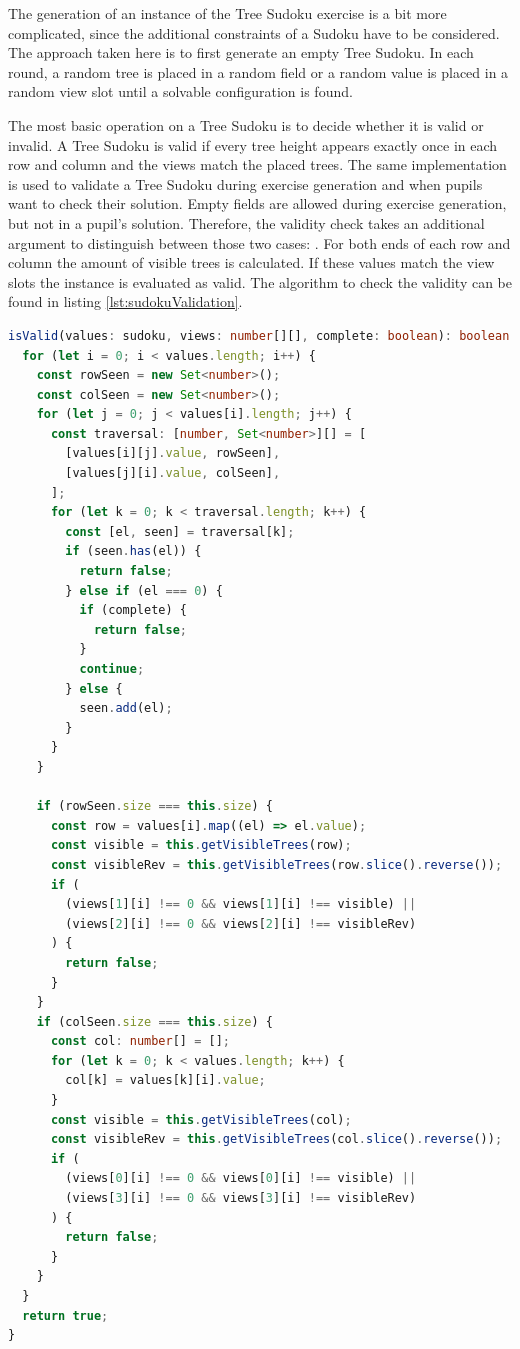 The generation of an instance of the Tree Sudoku exercise is a bit more complicated, since the additional constraints of a Sudoku have to be considered. The approach taken here is to first generate an empty Tree Sudoku. In each round, a random tree is placed in a random field or a random value is placed in a random view slot until a solvable configuration is found. 

The most basic operation on a Tree Sudoku is to decide whether it is valid or invalid. A Tree Sudoku is valid if every tree height appears exactly once in each row and column and the views match the placed trees.
The same implementation is used to validate a Tree Sudoku during exercise generation and when pupils want to check their solution. Empty fields  are allowed during exercise generation, but not in a pupil's solution. Therefore, the validity check takes an additional argument to distinguish between those two cases: .
For both ends of each row and column the amount of visible trees is calculated. If these values match the view slots the instance is evaluated as valid. The algorithm to check the validity can be found in listing \ref{lst:sudokuValidation}.

\begin{lstlisting}[language=TypeScript,caption={Validation algorithm for a Tree Sudoku instance},label={lst:sudokuValidation}]
isValid(values: sudoku, views: number[][], complete: boolean): boolean {
  for (let i = 0; i < values.length; i++) {
    const rowSeen = new Set<number>();
    const colSeen = new Set<number>();
    for (let j = 0; j < values[i].length; j++) {
      const traversal: [number, Set<number>][] = [
        [values[i][j].value, rowSeen],
        [values[j][i].value, colSeen],
      ];
      for (let k = 0; k < traversal.length; k++) {
        const [el, seen] = traversal[k];
        if (seen.has(el)) {
          return false;
        } else if (el === 0) {
          if (complete) {
            return false;
          }
          continue;
        } else {
          seen.add(el);
        }
      }
    }

    if (rowSeen.size === this.size) {
      const row = values[i].map((el) => el.value);
      const visible = this.getVisibleTrees(row);
      const visibleRev = this.getVisibleTrees(row.slice().reverse());
      if (
        (views[1][i] !== 0 && views[1][i] !== visible) ||
        (views[2][i] !== 0 && views[2][i] !== visibleRev)
      ) {
        return false;
      }
    }
    if (colSeen.size === this.size) {
      const col: number[] = [];
      for (let k = 0; k < values.length; k++) {
        col[k] = values[k][i].value;
      }
      const visible = this.getVisibleTrees(col);
      const visibleRev = this.getVisibleTrees(col.slice().reverse());
      if (
        (views[0][i] !== 0 && views[0][i] !== visible) ||
        (views[3][i] !== 0 && views[3][i] !== visibleRev)
      ) {
        return false;
      }
    }
  }
  return true;
}
\end{lstlisting}

